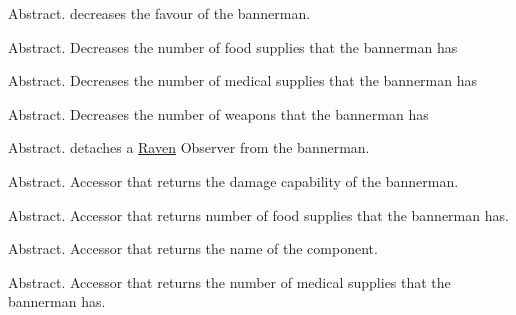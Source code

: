 \begin{DoxyRefList}
%
Abstract. decreases the favour of the bannerman.  
\item[Member \mbox{\hyperlink{class_bannerman_aa8ea9f0f89233a5e7435c52772fc2b43}{Bannerman\+::decrease\+Food}} ()=0]\label{todo__todo000018}%
%
Abstract. Decreases the number of food supplies that the bannerman has  
\item[Member \mbox{\hyperlink{class_bannerman_a0f16bb2b3ab703469ec9f05e81d2cefa}{Bannerman\+::decrease\+Medical}} ()=0]\label{todo__todo000019}%
%
Abstract. Decreases the number of medical supplies that the bannerman has  
\item[Member \mbox{\hyperlink{class_bannerman_aa5035baa2661e9af63bae7914efb51bc}{Bannerman\+::decrease\+Weapons}} ()=0]\label{todo__todo000017}%
%
Abstract. Decreases the number of weapons that the bannerman has  
\item[Member \mbox{\hyperlink{class_bannerman_a205b64898be42c673c9f34a03b356d8d}{Bannerman\+::detach}} (\mbox{\hyperlink{class_raven}{Raven}} $\ast$o)=0]\label{todo__todo000008}%
%
Abstract. detaches a \mbox{\hyperlink{class_raven}{Raven}} Observer from the bannerman.  
\item[Member \mbox{\hyperlink{class_bannerman_a1a5d6adb57fcf51eb355cdef86b72cb7}{Bannerman\+::get\+Damage}} ()=0]\label{todo__todo000015}%
%
Abstract. Accessor that returns the damage capability of the bannerman.  
\item[Member \mbox{\hyperlink{class_bannerman_adc69abec1cfbdb0a1d9edd434bfc53ae}{Bannerman\+::get\+Food}} ()=0]\label{todo__todo000022}%
%
Abstract. Accessor that returns number of food supplies that the bannerman has.  
\item[Member \mbox{\hyperlink{class_bannerman_a8c99451818f71d15d15e0bf35d4b62d6}{Bannerman\+::get\+HP}} ()=0]\label{todo__todo000014}%
%
Abstract. Accessor that returns the name of the component.  
\item[Member \mbox{\hyperlink{class_bannerman_a9bc89447b53e38cd0e9d6b5962419587}{Bannerman\+::get\+Medical}} ()=0]\label{todo__todo000023}%
%
Abstract. Accessor that returns the number of medical supplies that the bannerman has.  
\item[Member \mbox{\hyperlink{class_bannerman_ac34f077972ae84ad34b77bf6f174a0ce}{Bannerman\+::get\+Name}} ()]\label{todo__todo000013}%

\end{DoxyRefList}

